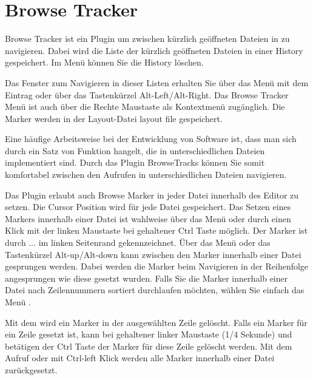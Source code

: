 \section{Browse Tracker}\label{sec:browsetracker}

Browse Tracker ist ein Plugin um zwischen kürzlich geöffneten Dateien in \codeblocks zu navigieren. Dabei wird die Liste der kürzlich geöffneten Dateien in einer History gespeichert. Im Menü  können Sie die History löschen.

Das Fenster  zum Navigieren in dieser Listen erhalten Sie über das Menü  mit dem Eintrag  oder über das Tastenkürzel Alt-Left/Alt-Right. Das Browse Tracker Menü ist auch über die Rechte Maustaste als Kontextmenü zugänglich. Die Marker werden in der Layout-Datei layout file  gespeichert.

Eine häufige Arbeitsweise bei der Entwicklung von Software ist, dass man sich durch ein Satz von Funktion hangelt, die in unterschiedlichen Dateien implementiert sind. Durch das Plugin BrowseTracks können Sie somit komfortabel zwischen den Aufrufen in unterschiedlichen Dateien navigieren.

Das Plugin erlaubt auch Browse Marker in jeder Datei innerhalb des \codeblocks Editor zu setzen. Die Cursor Position wird für jede Datei gespeichert. Das Setzen eines Markers innerhalb einer Datei ist wahlweise über das Menü  oder durch einen Klick mit der linken Maustaste bei gehaltener Ctrl Taste möglich. Der Marker ist durch $\ldots$ im linken Seitenrand gekennzeichnet. Über das Menü  oder das Tastenkürzel Alt-up/Alt-down kann zwischen den Marker innerhalb einer Datei gesprungen werden. Dabei werden die Marker beim Navigieren in der Reihenfolge angesprungen wie diese gesetzt wurden. Falls Sie die Marker innerhalb einer Datei nach Zeilennummern sortiert durchlaufen möchten, wählen Sie einfach das Menü .

Mit dem  wird ein Marker in der ausgewählten Zeile gelöscht. Falls ein Marker für ein Zeile gesetzt ist, kann bei gehaltener linker Maustaste (1/4 Sekunde) und betätigen der Ctrl Taste der Marker für diese Zeile gelöscht werden. Mit dem Aufruf  oder mit Ctrl-left Klick werden alle Marker innerhalb einer Datei zurückgesetzt.

